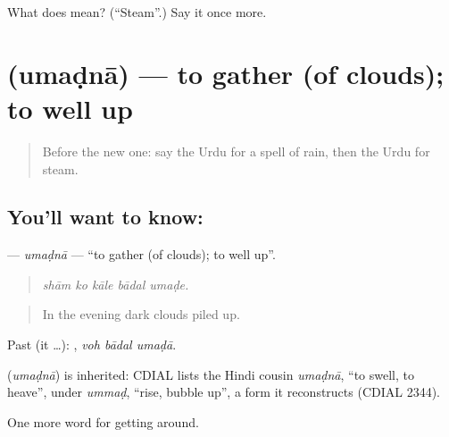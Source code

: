 \begin{tcolorbox}[breakable,colback=teal!4,colframe=teal!35!black,title={Before you move on}]
What does  mean? (\textquotedblleft{}Steam\textquotedblright{}.) Say it once more.
\end{tcolorbox}
\section[\texorpdfstring{\ur{امڈنا} (umaḍnā)}{امڈنا (umaḍnā)}]{ (umaḍnā) — to gather (of clouds); to well up}

\label{lesson:UR-C428-umadna}



\begin{quote}
Before the new one: say the Urdu for a spell of rain, then the Urdu for steam.
\end{quote}

\subsection*{You'll want to know: }
\textbf{} — \emph{umaḍnā} — \textquotedblleft{}to gather (of clouds); to well up\textquotedblright{}.

\begin{quote}
    
\end{quote}

\begin{quote}
\emph{shām ko kāle bādal umaḍe.}
\end{quote}

\begin{quote}
In the evening dark clouds piled up.
\end{quote}

Past (it …):   , \emph{voh bādal umaḍā}.

\begin{cousinweb}
\textbf{} (\emph{umaḍnā}) is inherited: CDIAL lists the Hindi cousin \emph{umaḍnā}, \textquotedblleft{}to swell, to heave\textquotedblright{}, under \emph{ummaḍ}, \textquotedblleft{}rise, bubble up\textquotedblright{}, a form it reconstructs (CDIAL 2344).
\end{cousinweb}

\begin{grammarlens}[title={What you've built}]
One more word for getting around.
\end{grammarlens}

